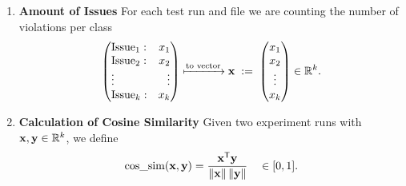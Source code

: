 \begin{enumerate}
  \item \textbf{Amount of Issues}  
        For each test run and file we are counting the number of violations per class
        \[
          \left(
            \begin{array}{@{}l r@{}}
              \text{Issue}_{1}: & x_{1}\\
              \text{Issue}_{2}: & x_{2}\\
              \vdots           & \vdots\\
              \text{Issue}_{\issues}: & x_{\issues}
            \end{array}
          \right)
          \xmapsto{\text{to vector}}
          \vx \;:=\;
          \vect{x_{1}\\x_{2}\\\vdots\\x_{\issues}} \in \mathbb R^{\issues}.
        \]

  \item \textbf{Calculation of Cosine Similarity}  
        Given two experiment runs with $\mathbf x,\mathbf y\in\mathbb R^{k}$, we define
        \[
          \operatorname{cos\_sim}(\mathbf x,\mathbf y)=
          \frac{\mathbf x^{\mathsf T}\mathbf y}{\lVert\mathbf x\rVert\,\lVert\mathbf y\rVert}
          \quad\in[0,1].
        \]
\end{enumerate}

